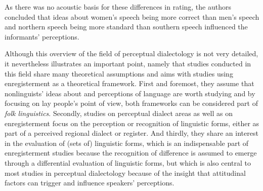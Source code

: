 As there was no acoustic basis for these differences in rating, the authors concluded that ideas about women’s speech being more correct than men’s speech and northern speech being more standard than southern speech influenced the informants’ perceptions.

Although this overview of the field of perceptual dialectology is not very detailed, it nevertheless illustrates an important point, namely that studies conducted in this field share many theoretical assumptions and aims with studies using enregisterment as a theoretical framework. First and foremost, they assume that nonlinguists’ ideas about and perceptions of language are worth studying and by focusing on lay people’s point of view, both frameworks can be considered part of \textit{folk linguistics}. Secondly, studies on perceptual dialect areas as well as on enregisterment focus on the perception or recognition of linguistic forms, either as part of a perceived regional dialect or register. And thirdly, they share an interest in the evaluation of (sets of) linguistic forms, which is an indispensable part of enregisterment studies because the recognition of difference is assumed to emerge through a differential evaluation of linguistic forms, but which is also central to most studies in perceptual dialectology because of the insight that attitudinal factors can trigger and influence speakers’ perceptions.


